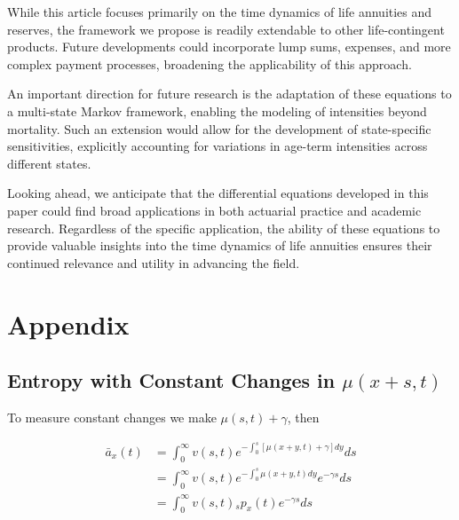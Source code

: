 \documentclass[12pt]{article}
\begin{document}
{While this article focuses primarily on the time dynamics of life annuities and reserves, the framework we propose is readily extendable to other life-contingent products. Future developments could incorporate lump sums, expenses, and more complex payment processes, broadening the applicability of this approach.

An important direction for future research is the adaptation of these equations to a multi-state Markov framework, enabling the modeling of intensities beyond mortality. Such an extension would allow for the development of state-specific sensitivities, explicitly accounting for variations in age-term intensities across different states.

Looking ahead, we anticipate that the differential equations developed in this paper could find broad applications in both actuarial practice and academic research. Regardless of the specific application, the ability of these equations to provide valuable insights into the time dynamics of life annuities ensures their continued relevance and utility in advancing the field.

\newpage


%
%



\newpage


\FloatBarrier
\newpage
\appendix
\section{Appendix}


\subsection{Entropy with Constant Changes in $\mu(x+s,t)$}\label{sec:EntropyConst}

To measure constant changes we make $\mu(s,t)+\gamma$, then

\begin{equation}\label{eq:EntropyConst1}
\begin{split}
\bar{a}_{x}(t) &= \int_0^\infty{v}(s,t) e^{-\int_{0}^{s} [\mu(x+y,t)+\gamma]dy}ds \\
&= \int_0^\infty {v}(s,t)e^{-\int_{0}^{s} \mu(x+y,t)dy} e^{-\gamma s}ds \\
&= \int_0^\infty {v}(s,t){}_sp_x(t) e^{-\gamma s}ds \\
\end{split}
\end{equation}

}
\end{document}
